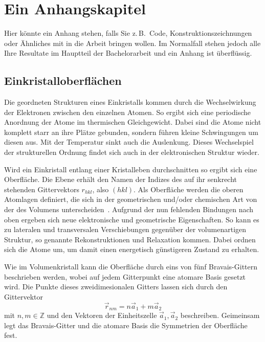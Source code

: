 \chapter{Ein Anhangskapitel}

Hier könnte ein Anhang stehen, falls Sie z.\,B.\ Code, Konstruktionszeichnungen oder Ähnliches mit in die Arbeit bringen wollen.
Im Normalfall stehen jedoch alle Ihre Resultate im Hauptteil der Bachelorarbeit und ein Anhang ist überflüssig.

\section{Einkristalloberflächen}
        Die geordneten Strukturen eines Einkristalls kommen durch die Wechselwirkung der Elektronen zwischen den einzelnen Atomen.
        So ergibt sich eine periodische Anordnung der Atome im thermischen Gleichgewicht.
        Dabei sind die Atome nicht komplett starr an ihre Plätze gebunden, sondern führen kleine Schwingungen um diesen aus.
        Mit der Temperatur sinkt auch die Auslenkung.
        Dieses Wechselspiel der strukturellen Ordnung findet sich auch in der elektronischen Struktur wieder.
                
        Wird ein Einkristall entlang einer Kristalleben durchschnitten so ergibt sich eine Oberfläche.
        Die Ebene erhält den Namen der Indizes des auf ihr senkrecht stehenden Gittervektors $r_{hkl}$, also $(hkl)$.
        Als Oberfläche werden die oberen Atomlagen definiert, die sich in der geometrischen und/oder chemischen Art von der des Volumens unterscheiden~\cite{Fauster}.
        Aufgrund der nun fehlenden Bindungen nach oben ergeben sich neue elektronische und geometrische Eigenschaften.
        So kann es zu lateralen und transversalen Verschiebungen gegenüber der volumenartigen Struktur, so genannte Rekonstruktionen und Relaxation kommen.
        Dabei ordnen sich die Atome um, um damit einen energetisch günstigeren Zustand zu erhalten.
    
        Wie im Volumenkristall kann die Oberfläche durch eins von fünf Bravais-Gittern beschrieben werden, wobei auf jedem Gitterpunkt eine atomare Basis gesetzt wird.
        Die Punkte dieses zweidimesionalen Gitters lassen sich durch den Gittervektor
        \begin{equation}
            \vec{r}_{nm} = n \vec{a}_1 + m \vec{a}_2
            \label{eqn:Gittervek}
        \end{equation}
        mit $n,m \in \mathbb{Z}$ und den Vektoren der Einheitszelle $\vec{a}_1, \vec{a}_2$ beschreiben.
        Geimeinsam legt das Bravais-Gitter und die atomare Basis die Symmetrien der Oberfläche fest.
    
